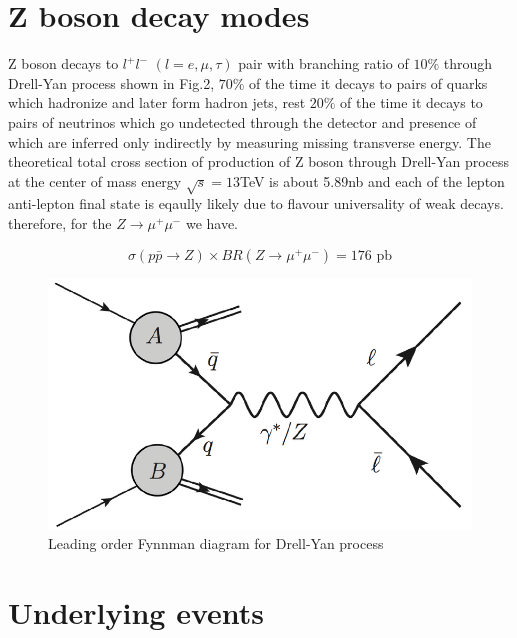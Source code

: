 \documentclass{article}		%
\begin{document}
\newpage
\section{Z boson decay modes}
 Z boson decays to $l^+l^-$ $(l= e,\mu,\tau)$ pair with branching ratio of $10 \% $ through Drell-Yan process shown in Fig.2, $70 \%$ of the time it decays to pairs of quarks which hadronize and later form hadron jets, rest $20 \%$ of the time it decays to pairs of neutrinos which go undetected through the detector and presence of which are inferred only indirectly by measuring missing transverse energy. The theoretical total cross section of production of Z boson through Drell-Yan process at the center of mass energy $\sqrt{s} = 13$TeV is about 5.89nb and each of the lepton anti-lepton final state is eqaully likely due to flavour universality of weak decays. therefore, for the $Z \to \mu^+\mu^-$ we have.
 
			 $$ \sigma( p \bar{p} \to Z) \times BR(Z \to \mu^+\mu^-) = 176  \text{ pb}$$ 
   
 \begin{figure}[h]
 		\centering	
 	\includegraphics[scale=0.5]{DrellYan.png} 
 	\caption{Leading order Fynnman diagram for Drell-Yan process}
 
 \end{figure}


\section{Underlying events}
\end{document}
